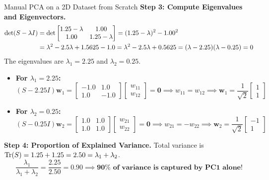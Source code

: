 \begin{examplebox}{Manual PCA on a 2D Dataset from Scratch}
\textbf{Step 3: Compute Eigenvalues and Eigenvectors.}
\begin{align}
\det(S - \lambda I) &= \det\begin{bmatrix} 1.25 - \lambda & 1.00 \\ 1.00 & 1.25 - \lambda \end{bmatrix} = (1.25 - \lambda)^2 - 1.00^2 \notag \\
&= \lambda^2 - 2.5\lambda + 1.5625 - 1.0 = \lambda^2 - 2.5\lambda + 0.5625 = (\lambda - 2.25)(\lambda - 0.25) = 0
\end{align}
The eigenvalues are $\lambda_1 = 2.25$ and $\lambda_2 = 0.25$.
\begin{itemize}
    \item \textbf{For $\lambda_1 = 2.25$:}
    \begin{equation}
    (S - 2.25I)\mathbf{w}_1 = \begin{bmatrix} -1.0 & 1.0 \\ 1.0 & -1.0 \end{bmatrix} \begin{bmatrix} w_{11} \\ w_{12} \end{bmatrix} = \mathbf{0} \implies w_{11} = w_{12} \implies \mathbf{w}_1 = \frac{1}{\sqrt{2}}\begin{bmatrix} 1 \\ 1 \end{bmatrix}
    \end{equation}
    \item \textbf{For $\lambda_2 = 0.25$:}
    \begin{equation}
    (S - 0.25I)\mathbf{w}_2 = \begin{bmatrix} 1.0 & 1.0 \\ 1.0 & 1.0 \end{bmatrix} \begin{bmatrix} w_{21} \\ w_{22} \end{bmatrix} = \mathbf{0} \implies w_{21} = -w_{22} \implies \mathbf{w}_2 = \frac{1}{\sqrt{2}}\begin{bmatrix} -1 \\ 1 \end{bmatrix}
    \end{equation}
\end{itemize}

\textbf{Step 4: Proportion of Explained Variance.}
Total variance is $\operatorname{Tr}(S) = 1.25 + 1.25 = 2.50 = \lambda_1 + \lambda_2$.
\begin{equation}
\frac{\lambda_1}{\lambda_1 + \lambda_2} = \frac{2.25}{2.50} = 0.90 \implies \mathbf{90\% \text{ of variance is captured by PC1 alone!}}
\end{equation}


\end{examplebox}
